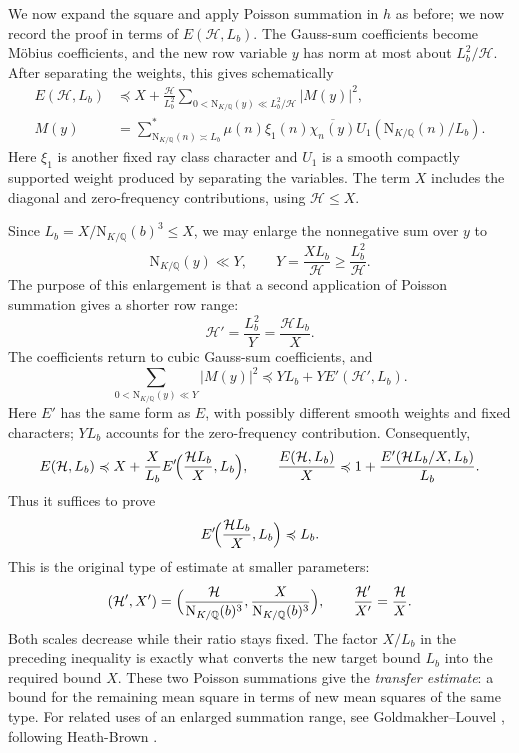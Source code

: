 \documentclass[11pt,a4paper]{article}
\numberwithin{equation}{section}
\numberwithin{figure}{section}
\theoremstyle{definition}
\theoremstyle{remark}
\newcommand{\Q}{\mathbb Q}
\newcommand{\NK}{\mathrm N_{K/\Q}}
\newcommand{\precbd}{\preccurlyeq}
\begin{document}
We now expand the square and apply Poisson summation in $h$ as before; we now record the proof in terms of $E(\mathcal H,L_b)$. The
Gauss-sum coefficients become M\"obius coefficients, and the new
row variable $y$ has norm at most about $L_b^2/\mathcal H$. After
separating the weights, this gives schematically
\[
 \begin{aligned}
 E(\mathcal H,L_b)
 &\precbd X+\frac{\mathcal H}{L_b^2}
 \sum_{0<\NK(y)\ll L_b^2/\mathcal H}|M(y)|^2,\\
 M(y)&=\sum_{\NK(n)\asymp L_b}^*
 \mu(n)\xi_1(n)\overline{\chi_n(y)}U_1(\NK(n)/L_b).
 \end{aligned}
\]
Here $\xi_1$ is another fixed ray class character and $U_1$ is a smooth compactly supported weight produced by separating the variables. The term $X$ includes the diagonal and zero-frequency
contributions, using $\mathcal H\le X$.

Since $L_b=X/\NK(b)^3\le X$, we may enlarge the nonnegative sum over $y$ to
\[
 \NK(y)\ll Y,\qquad
 Y=\frac{XL_b}{\mathcal H}\ge\frac{L_b^2}{\mathcal H}.
\]
The purpose of this enlargement is that a second application of
Poisson summation gives a shorter row range:
\[
 \mathcal H'=\frac{L_b^2}{Y}=\frac{\mathcal HL_b}{X}.
\]
The coefficients return to cubic Gauss-sum coefficients, and
\[
 \sum_{0<\NK(y)\ll Y}|M(y)|^2
 \precbd YL_b+Y E'(\mathcal H',L_b).
\]
Here $E'$ has the same form as $E$, with possibly different smooth
weights and fixed characters; $YL_b$ accounts for the
zero-frequency contribution. Consequently,
\[
 E(\mathcal H,L_b)
 \precbd X+\frac X{L_b} E'\!\Bigl(\frac{\mathcal HL_b}{X},L_b\Bigr),
 \qquad
 \frac{E(\mathcal H,L_b)}X
 \precbd 1+\frac{E'(\mathcal HL_b/X,L_b)}{L_b}.
\]
Thus it suffices to prove
\[
 E'\!\Bigl(\frac{\mathcal HL_b}{X},L_b\Bigr)\precbd L_b.
\]
This is the original type of estimate at smaller parameters:
\[
 (\mathcal H',X')
 =\Bigl(\frac{\mathcal H}{\NK(b)^3},
         \frac{X}{\NK(b)^3}\Bigr),
 \qquad
 \frac{\mathcal H'}{X'}=\frac{\mathcal H}{X}.
\]
Both scales decrease while their ratio stays fixed. The factor
$X/L_b$ in the preceding inequality is exactly what converts the
new target bound $L_b$ into the required bound $X$.
These two Poisson summations give the \emph{transfer estimate}: a bound
for the remaining mean square in terms of new mean squares of the same type.
For related uses of an enlarged summation range, see
Goldmakher--Louvel
\cite[Lemma~4.4 and the proof of Theorem~4.1]{GL}, following
Heath-Brown \cite[Lemma~9]{HB95}.
\end{document}
